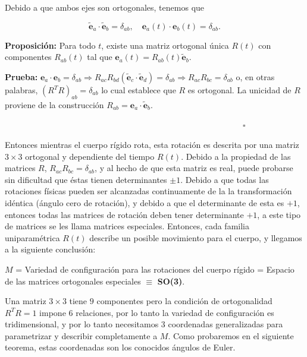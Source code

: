 \documentclass[a4paper,10pt]{article}
\numberwithin{equation}{section}
\newcommand{\prueba}{\textbf{Prueba: }}
\newcommand{\proposicion}{\textbf{Proposición: }}
\begin{document}
Debido a que ambos ejes son ortogonales, tenemos que 

\begin{equation}
 \tilde{\mathbf{e}}_a \cdot \tilde{\mathbf{e}}_b = \delta_{ab}, \quad \mathbf{e}_a(t) \cdot \mathbf{e}_b(t) = \delta_{ab}.
\end{equation}

\proposicion Para todo $t$, existe una matriz ortogonal única $R(t)$ con componentes 
$R_{ab}(t)$ tal que $\mathbf{e}_a(t) = R_{ab}(t)\tilde{\mathbf{e}}_b$.

\vspace{.3cm}

\prueba $\mathbf{e}_a \cdot \mathbf{e}_b = \delta_{ab} \Rightarrow R_{ac}R_{bd} 
(\tilde{\mathbf{e}}_c\cdot\tilde{\mathbf{e}}_d) = \delta_{ab} \Rightarrow R_{ac}R_{bc} = 
\delta_{ab}$ o, en otras palabras, $(R^TR)_{ab} = \delta_{ab}$ lo cual establece que 
$R$ es ortogonal. La unicidad de $R$ proviene de la construcción $R_{ab} = \mathbf{e}_a \cdot 
\tilde{\mathbf{e}}_b$.

$\hspace{12cm} \square$

\vspace{.3cm}

Entonces mientras el cuerpo rígido rota, esta rotación es descrita por una matriz 
$3\times 3$ ortogonal y dependiente del tiempo $R(t)$. Debido a la propiedad de 
las matrices $R$, $R_{ac}R_{bc} = \delta_{ab}$, y al hecho de que esta matriz es 
real, puede probarse sin dificultad que éstas tienen determinantes $\pm 1$. Debido 
a que todas las rotaciones físicas pueden ser alcanzadas continuamente de la 
la transformación idéntica (ángulo cero de rotación), y debido a que el determinante 
de esta es $+1$, entonces todas las matrices de rotación deben tener determinante $+1$, 
a este tipo de matrices se les llama matrices especiales. Entonces, cada familia uniparamétrica $R(t)$ describe un posible movimiento para 
el cuerpo, y llegamos a la siguiente conclusión:

\begin{center}
 $M$ = Variedad de configuración para  las rotaciones del cuerpo rígido = Espacio de las matrices 
 ortogonales especiales $\equiv$ \textbf{SO(3)}.
\end{center}

\vspace{.3cm}

Una matriz $3\times 3$ tiene $9$ componentes pero la condición de ortogonalidad $R^TR=1$
impone $6$ relaciones, por lo tanto la variedad de configuración es tridimensional, y 
por lo tanto necesitamos $3$ coordenadas generalizadas para parametrizar y describir 
completamente a $M$. Como probaremos en el siguiente teorema, estas coordenadas son 
los conocidos ángulos de Euler.
\end{document}
